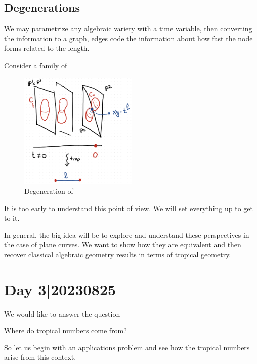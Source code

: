 \documentclass[12pt]{memoir}
\begin{document}
\subsection{Degenerations}
We may parametrize any algebraic variety with a time variable, then converting the information to a graph, edges code the information about how fast the node forms related to the length.\par
Consider a family of 
\begin{figure}[h!]
    \centering
    \includegraphics[width=0.5\textwidth]{figs/fig1-1.png}%
    \caption{Degeneration of }
    \label{fig:2-8-Degeneration}
\end{figure}

It is too early to understand this point of view. We will set everything up to get to it.\par 
In general, the big idea will be to explore and understand these perspectives in the case of plane curves. We want to show how they are equivalent and then recover classical algebraic geometry results in terms of tropical geometry.

\section{Day 3|20230825}

We would like to answer the question
\begin{significant}
    Where do tropical numbers come from?
\end{significant}
So let us begin with an applications problem and see how the tropical numbers arise from this context.

\end{document}
